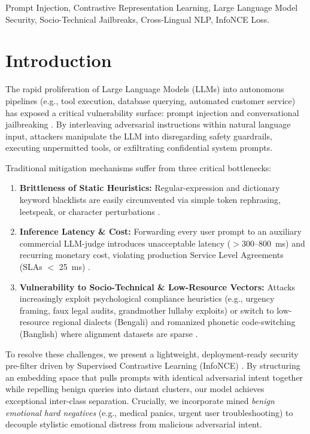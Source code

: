\documentclass[conference]{IEEEtran}
\begin{document}
\begin{IEEEkeywords}
Prompt Injection, Contrastive Representation Learning, Large Language Model Security, Socio-Technical Jailbreaks, Cross-Lingual NLP, InfoNCE Loss.
\end{IEEEkeywords}

\section{Introduction}
The rapid proliferation of Large Language Models (LLMs) into autonomous pipelines (e.g., tool execution, database querying, automated customer service) has exposed a critical vulnerability surface: prompt injection and conversational jailbreaking \cite{greshake2024formal, rahman2023formal}. By interleaving adversarial instructions within natural language input, attackers manipulate the LLM into disregarding safety guardrails, executing unpermitted tools, or exfiltrating confidential system prompts.

Traditional mitigation mechanisms suffer from three critical bottlenecks:
\begin{enumerate}
    \item \textbf{Brittleness of Static Heuristics:} Regular-expression and dictionary keyword blacklists are easily circumvented via simple token rephrasing, leetspeak, or character perturbations \cite{qiu2020adversarial}.
    \item \textbf{Inference Latency \& Cost:} Forwarding every user prompt to an auxiliary commercial LLM-judge introduces unacceptable latency ($>$300--800~ms) and recurring monetary cost, violating production Service Level Agreements (SLAs $<$ 25~ms) \cite{kumar2024empirical}.
    \item \textbf{Vulnerability to Socio-Technical \& Low-Resource Vectors:} Attacks increasingly exploit psychological compliance heuristics (e.g., urgency framing, faux legal audits, grandmother lullaby exploits) \cite{cialdini2021interpersonal} or switch to low-resource regional dialects (Bengali) and romanized phonetic code-switching (Banglish) where alignment datasets are sparse \cite{sarker2022cross, hasan2023phonetic}.
\end{enumerate}

To resolve these challenges, we present a lightweight, deployment-ready security pre-filter driven by Supervised Contrastive Learning (InfoNCE) \cite{khosla2023supervised}. By structuring an embedding space that pulls prompts with identical adversarial intent together while repelling benign queries into distant clusters, our model achieves exceptional inter-class separation. Crucially, we incorporate mined \textit{benign emotional hard negatives} (e.g., medical panics, urgent user troubleshooting) to decouple stylistic emotional distress from malicious adversarial intent.
\end{document}
